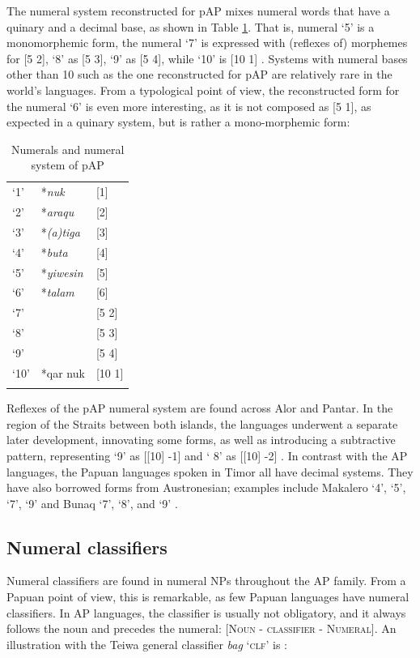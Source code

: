 {The numeral system reconstructed for pAP mixes numeral words that have a quinary and a decimal base, as shown in Table \ref{tab:1:11}. That is, numeral `5' is a monomorphemic form, the numeral `7' is expressed with (reflexes of) morphemes for [5 2], `8' as [5 3], `9' as [5 4], while `10' is [10 1] \citep{SchapperEtAlTV}. Systems with numeral bases other than 10 such as the one reconstructed for pAP are relatively rare in the world's languages. From a typological point of view, the reconstructed form for the numeral `6' is even more interesting, as it is not composed as [5 1], as expected in a quinary system, but is rather a mono-morphemic form:
 


\begin{table}
\begin{tabular}{lll}      
\mytoprule
`1' & *\textit{nuk}  &  [1] \\
`2' & *\textit{araqu}   &  [2] \\
`3' & *\textit{(a)tiga}  &  [3] \\
`4' & *\textit{buta}  &  [4] \\
`5' & *\textit{yiwesin}  &  [5]  \\
`6' & *\textit{talam}  &  [6] \\
`7' &  &  [5 2] \\
`8' &  &  [5 3] \\
`9' &  &  [5 4] \\
`10' & *qar nuk  & [10 1] \\
\mybottomrule
\end{tabular}
\caption{Numerals and numeral system of pAP \citep{SchapperKlamerTV}}
\label{tab:1:11}
\end{table}

Reflexes of the pAP numeral system are found across Alor and Pantar.  In the region of the Straits between both islands, the languages underwent a separate later development, innovating some forms, as well as introducing a subtractive pattern, representing `9' as [[10] -1] and ` 8' as [[10] -2] \citep{SchapperKlamerTV}. In contrast with the AP languages, the Papuan languages spoken in Timor all have decimal systems. They have also borrowed forms from Austronesian; examples include Makalero `4', `5', `7', `9' \citep{Huber2011} and Bunaq `7', `8', and `9' \citep{Schapper2010}. 

\subsection{Numeral classifiers}\label{sec:1:6.3}
Numeral classifiers are found in numeral NPs throughout the AP family. From a Papuan point of view, this is remarkable, as few Papuan languages have numeral classifiers. In AP languages, the classifier is usually not obligatory, and it always follows the noun and precedes the numeral: \textsc{[Noun - classifier - Numeral]. A}n illustration with the Teiwa general classifier \textit{bag} `\textsc{clf}' is :



}
